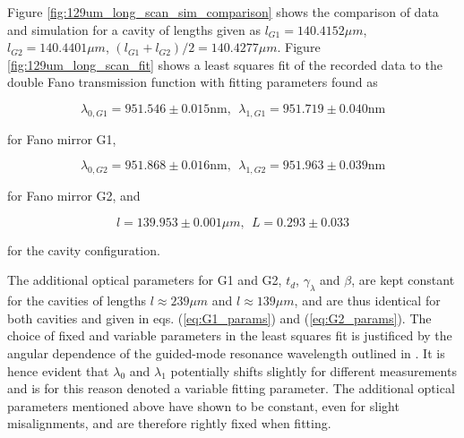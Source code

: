 Figure \ref{fig:129um_long_scan_sim_comparison} shows the comparison of data and simulation for a cavity of lengths given as $l_{G1} = 140.4152 \mu m$, $l_{G2} = 140.4401 \mu m$, $(l_{G1} + l_{G2})/2 = 140.4277 \mu m$. Figure \ref{fig:129um_long_scan_fit} shows a least squares fit of the recorded data to the double Fano transmission function with fitting parameters found as 

\begin{equation}
    \lambda_{0,G1} = 951.546 \pm 0.015 \text{nm}, \:\: \lambda_{1,G1} = 951.719 \pm 0.040 \text{nm}
\end{equation}

for Fano mirror G1,

\begin{equation}
    \lambda_{0,G2} = 951.868 \pm 0.016 \text{nm}, \:\: \lambda_{1,G2} = 951.963 \pm 0.039 \text{nm}
\end{equation}

for Fano mirror G2, and

\begin{equation}
    l = 139.953 \pm 0.001 \mu m, \:\: L = 0.293 \pm 0.033
\end{equation}

for the cavity configuration.

The additional optical parameters for G1 and G2, $t_d$, $\gamma_{\lambda}$ and $\beta$, are kept constant for the cavities of lengths $l\approx 239 \mu m$ and $l \approx 139 \mu m$, and are thus identical for both cavities and given in eqs. (\ref{eq:G1_params}) and (\ref{eq:G2_params}). The choice of fixed and variable parameters in the least squares fit is justificed by the angular dependence of the guided-mode resonance wavelength outlined in \cite{Parthenopoulos}. It is hence evident that $\lambda_0$ and $\lambda_1$ potentially shifts slightly for different measurements and is for this reason denoted a variable fitting parameter. The additional optical parameters mentioned above have shown to be constant, even for slight misalignments, and are therefore rightly fixed when fitting. 

